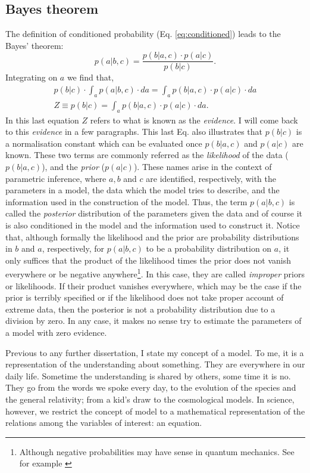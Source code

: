 \subsection{Bayes theorem}
The definition of conditioned probability (Eq. \ref{eq:conditioned}) leads to the Bayes' theorem:
\begin{equation}
p(a|b,c) = \frac{p(b|a,c)\cdot p(a|c)}{p(b|c)}.
\end{equation}
Integrating on $a$ we find that,
\begin{align}
\label{eq:evidence}
p(b|c) \cdot \int_a p(a|b,c)\cdot da = \int_a p(b|a,c) \cdot p(a|c) \cdot da \nonumber \\
Z \equiv p(b|c) = \int_a p(b|a,c) \cdot p(a|c) \cdot da.
\end{align}
In this last equation $Z$ refers to what is known as the \emph{evidence}. I will come back to this \emph{evidence} in a few paragraphs. This last Eq. also illustrates that $p(b|c)$ is a normalisation constant which can be evaluated once $p(b|a,c)$ and $p(a|c)$ are known. These two terms are commonly referred as the \emph{likelihood} of the data ($p(b|a,c)$), and the \emph{prior} ($p(a|c)$). These names arise in the context of parametric inference, where $a,b$ and $c$ are identified, respectively, with the parameters in a model, the data which the model tries to describe, and the information used in the construction of the model. Thus, the term $p(a|b,c)$ is called the \emph{posterior} distribution of the parameters given the data and of course it is also conditioned in the model and the information used to construct it. Notice that, although formally the likelihood and the prior are probability distributions in $b$ and $a$, respectively, for $p(a|b,c)$ to be a probability distribution on $a$, it only suffices that the product of the likelihood times the prior does not vanish everywhere or be negative anywhere\footnote{Although negative probabilities may have sense in quantum mechanics. See for example \citep{1942RSPSA.180....1D}}. In this case, they are called \emph{improper} priors or likelihoods. If their product vanishes everywhere, which may be the case if the prior is terribly specified or if the likelihood does not take proper account of extreme data, then the posterior is not a probability distribution due to a division by zero. In any case, it makes no sense try to estimate the parameters of a model with zero evidence.

Previous to any further dissertation, I state my concept of a model. To me, it is a representation of the understanding about something. They are everywhere in our daily life. Sometime the understanding is shared by others, some time it is no. They go from the words we spoke every day, to the evolution of the species and the general relativity; from a kid's draw to the cosmological models. In science, however, we restrict the concept of model to a mathematical representation of the relations among the variables of interest: an equation.   

